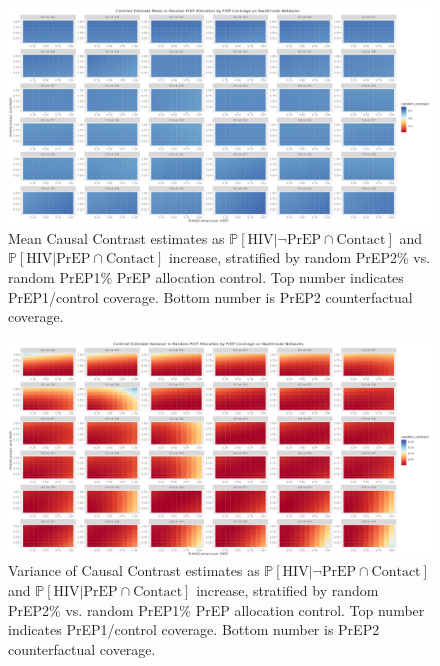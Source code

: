 \documentclass{article}
\theoremstyle{definition}
\begin{document}
\begin{figure}[H]
    \centering
    \includegraphics[width=\linewidth]{Corrected Figures/PrEP Random Mean Plots.png}
    \caption{Mean Causal Contrast estimates as $\mathbb{P}\left[\text{HIV} \vert \neg \text{PrEP} \cap \text{Contact}\right]$ and $\mathbb{P}\left[\text{HIV} \vert \text{PrEP} \cap \text{Contact}\right]$ increase, stratified by random PrEP2\% vs. random PrEP1\% PrEP allocation control. Top number indicates PrEP1/control coverage. Bottom number is PrEP2 counterfactual coverage.}
    \label{fig:Figure S4.13}
\end{figure}
\begin{figure}[H]
    \centering
    \includegraphics[width=\linewidth]{Corrected Figures/PrEP Random Variance Plots.png}
    \caption{Variance of Causal Contrast estimates as $\mathbb{P}\left[\text{HIV} \vert \neg \text{PrEP} \cap \text{Contact}\right]$ and $\mathbb{P}\left[\text{HIV} \vert \text{PrEP} \cap \text{Contact}\right]$ increase, stratified by random PrEP2\% vs. random PrEP1\% PrEP allocation control. Top number indicates PrEP1/control coverage. Bottom number is PrEP2 counterfactual coverage.}
    \label{fig:Figure S4.14}
\end{figure}
\end{document}
